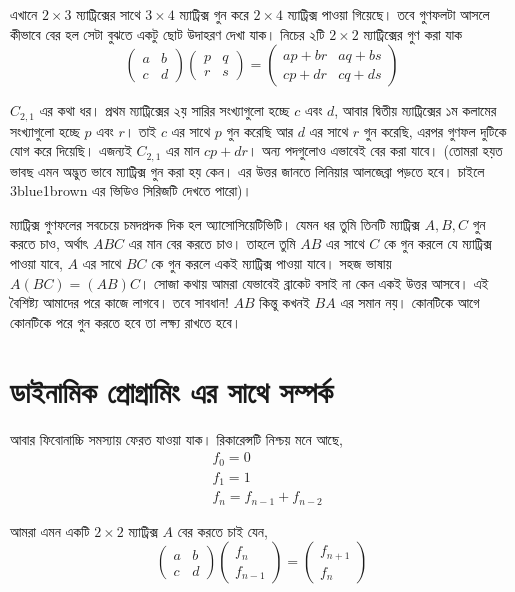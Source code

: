 এখানে $2 \times 3$ ম্যাট্রিক্সের সাথে $3 \times 4$ ম্যাট্রিক্স গুন করে $2 \times 4$ ম্যাট্রিক্স পাওয়া গিয়েছে। তবে গুণফলটা আসলে কীভাবে বের হল সেটা বুঝতে একটু ছোট উদাহরণ দেখা যাক। নিচের ২টি $2 \times 2$ ম্যাট্রিক্সের গুণ করা যাক
 $$
\begin{pmatrix}
a & b \\
c & d
\end{pmatrix}
\begin{pmatrix}
p & q \\
r & s
\end{pmatrix} = 
\begin{pmatrix}
ap + br & aq + bs \\
cp + dr & cq + ds
\end{pmatrix}
$$

$C_{2, 1}$ এর কথা ধর। প্রথম ম্যাট্রিক্সের ২য় সারির সংখ্যাগুলো হচ্ছে $c$ এবং $d$, আবার দ্বিতীয় ম্যাট্রিক্সের ১ম কলামের সংখ্যাগুলো হচ্ছে $p$ এবং $r$। তাই $c$ এর সাথে $p$ গুন করেছি আর $d$ এর সাথে $r$ গুন  করেছি, এরপর গুণফল দুটিকে যোগ করে দিয়েছি। এজন্যই $C_{2, 1}$ এর মান $cp + dr$। অন্য পদগুলোও এভাবেই বের করা যাবে। (তোমরা হয়ত ভাবছ এমন অদ্ভুত ভাবে ম্যাট্রিক্স গুন করা হয় কেন। এর উত্তর জানতে লিনিয়ার আলজেব্রা পড়তে হবে। চাইলে 3blue1brown এর ভিডিও সিরিজটি দেখতে পারো)। 

ম্যাট্রিক্স গুণফলের সবচেয়ে চমদপ্রদক দিক হল অ্যাসোসিয়েটিভিটি। যেমন ধর তুমি তিনটি ম্যাট্রিক্স $A, B, C$ গুন করতে চাও, অর্থাৎ $ABC$ এর মান বের করতে চাও। তাহলে তুমি $AB$ এর সাথে $C$ কে গুন করলে যে ম্যাট্রিক্স পাওয়া যাবে, $A$ এর সাথে $BC$ কে গুন করলে একই ম্যাট্রিক্স পাওয়া যাবে। সহজ ভাষায় $A(BC) = (AB)C$। সোজা কথায় আমরা যেভাবেই ব্রাকেট বসাই না কেন একই উত্তর আসবে। এই বৈশিষ্ট্য আমাদের পরে কাজে লাগবে। তবে সাবধান! $AB$ কিন্তু কখনই $BA$ এর সমান নয়। কোনটিকে আগে কোনটিকে পরে গুন করতে হবে তা লক্ষ্য রাখতে হবে। 

\section{ডাইনামিক প্রোগ্রামিং এর সাথে সম্পর্ক}
আবার ফিবোনাচ্চি সমস্যায় ফেরত যাওয়া যাক। রিকারেন্সটি নিশ্চয় মনে আছে,
\begin{align*}
& f_{0} = 0 \\
& f_{1} = 1 \\
& f_{n} = f_{n - 1} + f_{n - 2}
\end{align*}

আমরা এমন একটি $2 \times 2$ ম্যাট্রিক্স $A$ বের করতে চাই যেন,
$$
\begin{pmatrix}
a & b \\
c & d
\end{pmatrix} 
\begin{pmatrix}
f_{n} \\
f_{n - 1}
\end{pmatrix}
= 
\begin{pmatrix}
f_{n + 1} \\
f_{n}
\end{pmatrix}
$$ 

